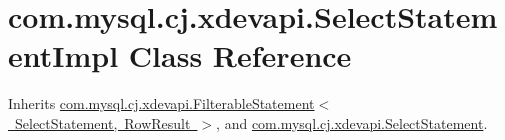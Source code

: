 \hypertarget{classcom_1_1mysql_1_1cj_1_1xdevapi_1_1_select_statement_impl}{}\section{com.\+mysql.\+cj.\+xdevapi.\+Select\+Statement\+Impl Class Reference}
\label{classcom_1_1mysql_1_1cj_1_1xdevapi_1_1_select_statement_impl}


Inherits \mbox{\hyperlink{classcom_1_1mysql_1_1cj_1_1xdevapi_1_1_filterable_statement}{com.\+mysql.\+cj.\+xdevapi.\+Filterable\+Statement$<$ Select\+Statement, Row\+Result $>$}}, and \mbox{\hyperlink{interfacecom_1_1mysql_1_1cj_1_1xdevapi_1_1_select_statement}{com.\+mysql.\+cj.\+xdevapi.\+Select\+Statement}}.

